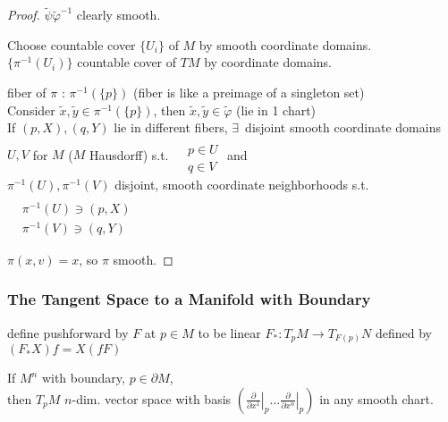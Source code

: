 \begin{proof}
$\widetilde{\psi} \widetilde{\varphi}^{-1}$ clearly smooth. 

Choose countable cover $\lbrace U_i \rbrace$ of $M$ by smooth coordinate domains.  \\
$\lbrace \pi^{-1}(U_i) \rbrace$ countable cover of $TM$ by coordinate domains.  

fiber of $\pi$ : $\pi^{-1}( \lbrace p \rbrace)$ (fiber is like a preimage of a singleton set) \\
Consider $\widetilde{x}, \widetilde{y} \in \pi^{-1}(\lbrace p \rbrace)$, then $\widetilde{x}, \widetilde{y} \in \widetilde{\varphi}$ (lie in 1 chart) \\
If $(p,X), (q,Y)$ lie in different fibers, $\exists \, $ disjoint smooth coordinate domains $U,V$ for $M$ ($M$ Hausdorff) s.t. $\begin{aligned} & \quad \\ 
  & p \in U \\
  & q \in V \end{aligned}$ and  \\
$\pi^{-1}(U), \pi^{-1}(V)$ disjoint, smooth coordinate neighborhoods s.t. $\begin{aligned} & \quad \\ 
  & \pi^{-1}(U) \ni (p,X) \\ 
  & \pi^{-1}(V) \ni (q,Y) \end{aligned}$

$\pi(x,v) = x$, so $\pi$ smooth.  

\end{proof}




\subsubsection*{The Tangent Space to a Manifold with Boundary}


define pushforward by $F$ at $p\in M$ to be linear $F_*:T_pM \to T_{F(p)}N$ defined by $(F_*X)f = X(fF)$

\begin{lemma}[3.10] If $M^n$ with boundary, $p\in \partial M$, \\
then $T_pM$ $n$-dim. vector space with basis $\left( \left. \frac{ \partial }{ \partial x^1 } \right|_p \dots \left. \frac{ \partial }{ \partial x^n } \right|_p \right)$ in any smooth chart. 
\end{lemma}

